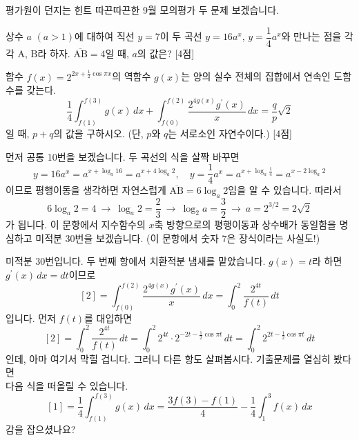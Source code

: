 \documentclass[serif]{beamer}
\begin{document}
\begin{frame}{평가원이 던지는 힌트}
    따끈따끈한 9월 모의평가 두 문제 보겠습니다.
    \begin{hint}
        상수 $a$ $(a>1)$에 대하여 직선 $y=7$이 두 곡선 $y=16a^x$, $y=\dfrac{1}{4}a^x$와 만나는 점을 각각 $\mathrm A$, $\mathrm B$라 하자.
        $\overline{\mathrm{AB}}=4$일 때, $a$의 값은? [4점]
    \end{hint}
    \begin{hint}
        함수 $f(x)=2^{2x+\frac{1}{2}\cos\pi x}$의 역함수 $g(x)$는 양의 실수 전체의 집합에서 연속인 도함수를 갖는다.
        \[
            \frac{1}{4}\int_{f(1)}^{f(3)}g(x)\,dx+\int_{f(0)}^{f(2)}\frac{2^{4g(x)}g^\prime(x)}{x}\,dx=\frac{q}{p}\sqrt{2}
        \]
        일 때, $p+q$의 값을 구하시오. (단, $p$와 $q$는 서로소인 자연수이다.) [4점]
    \end{hint}
\end{frame}

\begin{frame}
    먼저 공통 10번을 보겠습니다. 두 곡선의 식을 살짝 바꾸면
    \[
        y=16a^x=a^{x+\log_a16}=a^{x+4\log_a2},\quad y=\frac{1}{4}a^x=a^{x+\log_a\frac{1}{4}}=a^{x-2\log_a2}
    \]
    이므로 평행이동을 생각하면 자연스럽게 $\overline{\mathrm{AB}}=6\log_a2$임을 알 수 있습니다. 따라서
    \[
        6\log_a2=4~\longrightarrow~\log_a2=\frac{2}{3}~\longrightarrow~\log_2a=\frac{3}{2}~\longrightarrow~a=2^{3/2}=2\sqrt{2}
    \]
    가 됩니다. 이 문항에서 지수함수의 $x$축 방향으로의 평행이동과 상수배가 동일함을 명심하고 미적분 30번을 보겠습니다. (이 문항에서 숫자 $7$은 장식이라는 사실도!)
\end{frame}

\begin{frame}{}
    미적분 30번입니다. 두 번째 항에서 치환적분 냄새를 맡았습니다. $g(x)=t$라 하면 $g^\prime(x)\,dx=dt$이므로
    \[
        [\text{2}]=\int_{f(0)}^{f(2)}\frac{2^{4g(x)}g^\prime(x)}{x}\,dx=\int_{0}^{2}\frac{2^{4t}}{f(t)}\,dt
    \]
    입니다. 먼저 $f(t)$를 대입하면
    \[
        [\text{2}]=\int_{0}^{2}\frac{2^{4t}}{f(t)}\,dt=\int_{0}^{2}2^{4t}\cdot 2^{-2t-\frac{1}{2}\cos\pi t}\,dt=\int_{0}^{2}2^{2t-\frac{1}{2}\cos\pi t}\,dt
    \]
    인데, 아마 여기서 막힐 겁니다. 그러니 다른 항도 살펴봅시다. 기출문제를 열심히 봤다면 \\ 다음 식을 떠올릴 수 있습니다.
    \[
        [\text{1}]=\frac{1}{4}\int_{f(1)}^{f(3)}g(x)\,dx=\frac{3f(3)-f(1)}{4}-\frac{1}{4}\int_{1}^{3}f(x)\,dx
    \]
    감을 잡으셨나요?
\end{frame}
\end{document}
